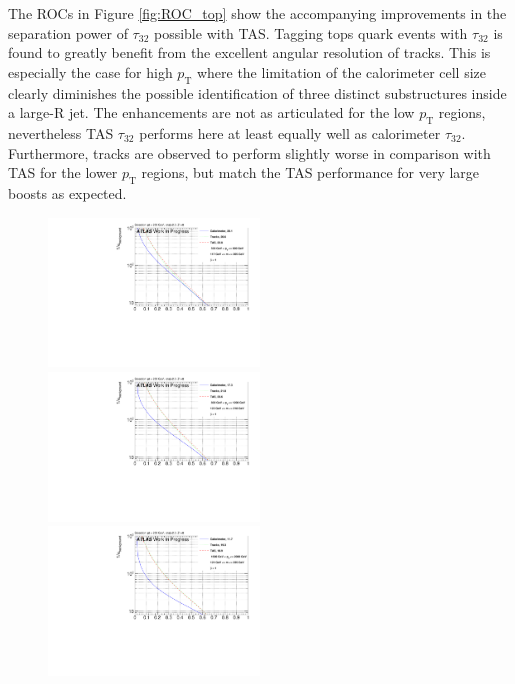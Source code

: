 The ROCs in Figure \ref{fig:ROC_top} show the accompanying improvements in the separation power of $\tau_{32}$ possible with TAS. Tagging tops quark events with $\tau_{32}$ is found to greatly benefit from the excellent angular resolution of tracks. This is especially the case for high $p_{\mathrm{T}}$ where the limitation of the calorimeter cell size clearly diminishes the possible identification of three distinct substructures inside a large-R jet. The enhancements are not as articulated for the low $p_{\mathrm{T}}$ regions, nevertheless TAS $\tau_{32}$ performs here at least equally well as calorimeter $\tau_{32}$. Furthermore, tracks are observed to perform slightly worse in comparison with TAS for the lower $p_{\mathrm{T}}$ regions, but match the TAS performance for very large boosts as expected.
\begin{figure}[htp]
\includegraphics[width=0.5\textwidth]{sascha_input/plots/Top/beta1/ROC_ALL_h_recoJet_nSub32_bin2.pdf} \hspace{1mm}
\includegraphics[width=0.5\textwidth]{sascha_input/plots/Top/beta1/ROC_ALL_h_recoJet_nSub32_bin3.pdf}
\bigskip
\includegraphics[width=0.5\textwidth]{sascha_input/plots/Top/beta1/ROC_ALL_h_recoJet_nSub32_bin5.pdf} \hspace{1mm}

\end{figure}
